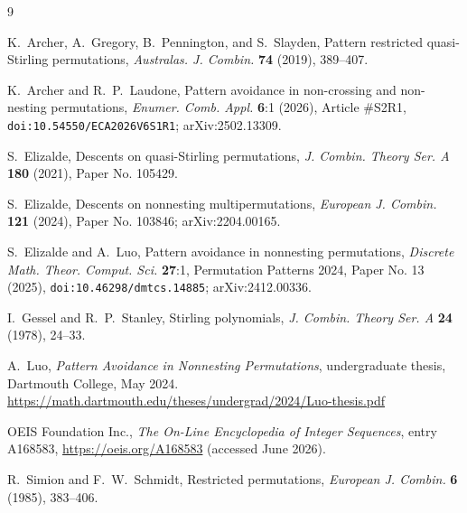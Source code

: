 \documentclass[11pt]{article}
\theoremstyle{definition}
\theoremstyle{remark}
\begin{document}
\begin{thebibliography}{9}

K.~Archer, A.~Gregory, B.~Pennington, and S.~Slayden,
Pattern restricted quasi-Stirling permutations,
\emph{Australas. J. Combin.} \textbf{74} (2019), 389--407.

K.~Archer and R.~P.~Laudone,
Pattern avoidance in non-crossing and non-nesting permutations,
\emph{Enumer. Comb. Appl.} \textbf{6}:1 (2026), Article \#S2R1,
\texttt{doi:10.54550/ECA2026V6S1R1}; arXiv:2502.13309.

S.~Elizalde,
Descents on quasi-Stirling permutations,
\emph{J. Combin. Theory Ser. A} \textbf{180} (2021), Paper No. 105429.

S.~Elizalde,
Descents on nonnesting multipermutations,
\emph{European J. Combin.} \textbf{121} (2024), Paper No. 103846;
arXiv:2204.00165.

S.~Elizalde and A.~Luo,
Pattern avoidance in nonnesting permutations,
\emph{Discrete Math. Theor. Comput. Sci.} \textbf{27}:1, Permutation
Patterns 2024, Paper No. 13 (2025), \texttt{doi:10.46298/dmtcs.14885};
arXiv:2412.00336.

I.~Gessel and R.~P.~Stanley,
Stirling polynomials,
\emph{J. Combin. Theory Ser. A} \textbf{24} (1978), 24--33.

A.~Luo,
\emph{Pattern Avoidance in Nonnesting Permutations},
undergraduate thesis, Dartmouth College, May 2024.
\url{https://math.dartmouth.edu/theses/undergrad/2024/Luo-thesis.pdf}

OEIS Foundation Inc.,
\emph{The On-Line Encyclopedia of Integer Sequences},
entry A168583, \url{https://oeis.org/A168583} (accessed June 2026).

R.~Simion and F.~W.~Schmidt,
Restricted permutations,
\emph{European J. Combin.} \textbf{6} (1985), 383--406.

\end{thebibliography}
\end{document}
